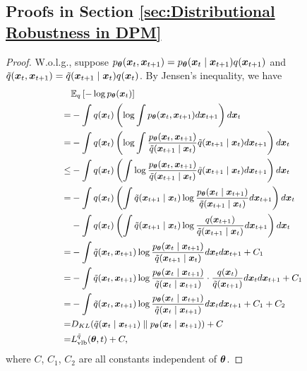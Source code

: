 \subsection{Proofs in Section \ref{sec:Distributional Robustness in DPM}}\label{app:proofs in sec:Distributional Robustness in DPM}
\advelboupperbound*
\begin{proof}
   W.o.l.g., suppose $p_{\btheta}(\bx_{t}, \bx_{t + 1}) = p_{\btheta}(\bx_{t} \mid \bx_{t + 1})q(\bx_{t + 1})$ and $\tq(\bx_{t}, \bx_{t + 1}) = \tq(\bx_{t + 1}\mid \bx_{t})q(\bx_{t})$. By Jensen's inequality, we have  
\begin{equation}\label{eq:variational bound}
    \small
    \begin{aligned}
        & \mE_{q}\left[-\log{p_{\btheta}}(\bx_{t})\right] \\
        =& -\int q(\bx_{t})\left(\log{\int p_{\btheta}(\bx_{t}, \bx_{t + 1})}d\bx_{t + 1}\right)d\bx_{t} \\
        =&  -\int q(\bx_{t})\left(\log{\int \frac{p_{\btheta}(\bx_{t}, \bx_{t + 1})}{\tq(\bx_{t + 1}\mid \bx_{t})}\tq(\bx_{t + 1}\mid \bx_{t})}d\bx_{t + 1}\right)d\bx_{t} \\
        \leq &  -\int q(\bx_{t})\left(\int \log{ \frac{p_{\btheta}(\bx_{t}, \bx_{t + 1})}{\tq(\bx_{t + 1}\mid \bx_{t})}}\tq(\bx_{t + 1}\mid \bx_{t})d\bx_{t + 1}\right)d\bx_{t} \\
        = &   -\int q(\bx_{t})\left(\int \tq(\bx_{t + 1}\mid \bx_{t})\log{\frac{p_{\btheta}(\bx_{t} \mid \bx_{t + 1})}{\tq(\bx_{t + 1}\mid \bx_{t})}}d\bx_{t + 1}\right)d\bx_{t}\\
        & - \int q(\bx_{t})\left(\int \tq(\bx_{t + 1}\mid \bx_{t})\log{\frac{q(\bx_{t + 1})}{\tq(\bx_{t + 1}\mid \bx_{t})}}d\bx_{t + 1}\right)d\bx_{t} \\
        = & -\int \tq(\bx_{t}, \bx_{t+1})\log{\frac{p_{\btheta}(\bx_{t} \mid \bx_{t + 1})}{\tq(\bx_{t + 1}\mid \bx_{t})}} d\bx_{t} d\bx_{t + 1} + C_1\\
        = & -\int \tq(\bx_{t}, \bx_{t+1})\log{\frac{p_{\btheta}(\bx_{t} \mid \bx_{t + 1})}{\tq(\bx_{t}\mid \bx_{t + 1})}\cdot \frac{q(\bx_t)}{\tq(\bx_{t+1})}} d\bx_{t} d\bx_{t + 1} + C_1\\
        = & -\int \tq(\bx_{t}, \bx_{t+1})\log{\frac{p_{\btheta}(\bx_{t} \mid \bx_{t + 1})}{\tq(\bx_{t}\mid \bx_{t + 1})}} d\bx_{t} d\bx_{t + 1} + C_1 + C_2\\
        = &  D_{KL}(\tq(\bx_{t}\mid \bx_{t + 1}) \parallel p_{\btheta}(\bx_{t}\mid \bx_{t + 1})) + C \\
        = & L_{\mathrm{vlb}}^{\tq}(\btheta, t) + C, 
    \end{aligned}
\end{equation}
    where $C$, $C_{1}$, $C_{2}$ are all constants independent of $\btheta$. 
\end{proof}

